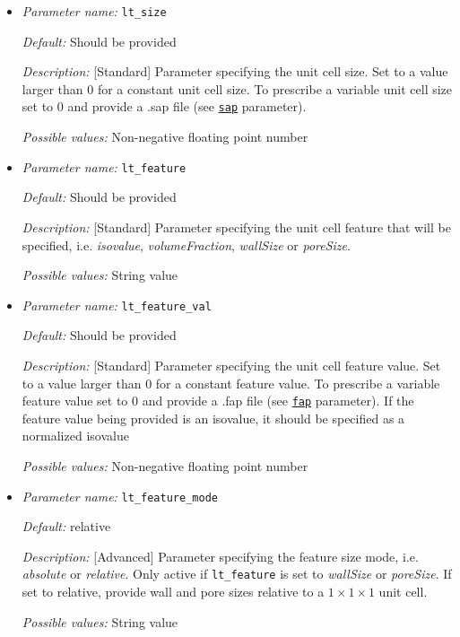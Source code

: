 \begin{itemize}
	\item {\it Parameter name:} {\tt lt\_size}
	\label{parameters:lt_size}
	
	
	{\it Default:} Should be provided
	
	{\it Description:} [Standard] Parameter specifying the unit cell size. Set to a value larger than 0 for a constant unit cell size. To prescribe a variable unit cell size set to 0 and provide a .sap file (see \hyperref[parameters:sap]{\tt sap} parameter).
	
	{\it Possible values:} Non-negative floating point number
	
	\item {\it Parameter name:} {\tt lt\_feature}
	\label{parameters:lt_feature}
	
	
	{\it Default:} Should be provided
	
	{\it Description:} [Standard] Parameter specifying the unit cell feature that will be specified, i.e. {\it isovalue}, {\it volumeFraction}, {\it wallSize} or {\it poreSize}.
	
	{\it Possible values:} String value
	
	\item {\it Parameter name:} {\tt lt\_feature\_val}
	\label{parameters:lt_feature_val}
	
	
	{\it Default:} Should be provided
	
	{\it Description:} [Standard] Parameter specifying the unit cell feature value. Set to a value larger than 0 for a constant feature value. To prescribe a variable feature value set to 0 and provide a .fap file (see \hyperref[parameters:fap]{\tt fap} parameter). If the feature value being provided is an isovalue, it should be specified as a normalized isovalue
	
	{\it Possible values:} Non-negative floating point number
	
	\item {\it Parameter name:} {\tt lt\_feature\_mode}
	\label{parameters:lt_feature_mode}
	
	
	{\it Default:} relative
	
	{\it Description:} [Advanced] Parameter specifying the feature size mode, i.e. {\it absolute} or {\it relative}. Only active if {\tt lt\_feature} is set to {\it wallSize} or {\it poreSize}. If set to relative, provide wall and pore sizes relative to a $1 \times 1 \times 1$ unit cell.
	
	{\it Possible values:} String value
\end{itemize}

